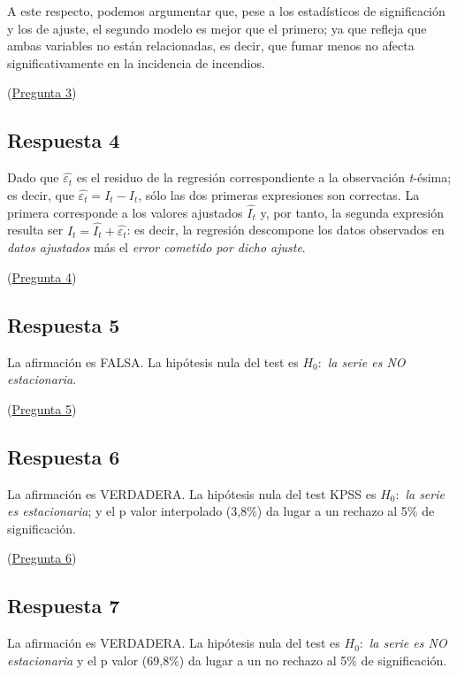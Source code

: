 \documentclass[10pt]{article}
\begin{document}
A este respecto, podemos argumentar que, pese a los estadísticos de significación y los de ajuste, el segundo modelo es mejor que el primero; ya que refleja que ambas variables no están relacionadas, es decir, que fumar menos no afecta significativamente en la incidencia de incendios.

(\hyperref[sec:org8d61215]{Pregunta 3})
\subsection*{Respuesta 4}
\label{sec:orgd2ab241}

Dado que  \(\widehat{\varepsilon_t}\) es el residuo de la regresión correspondiente a la observación \emph{t}-ésima; es decir, que \(\widehat{\varepsilon_t}={I_t}-\widehat{I_t}\), sólo las dos primeras expresiones son correctas. La primera corresponde a los valores ajustados \(\widehat{I_t}\) y, por tanto, la segunda expresión resulta ser \({I_t}=\widehat{I_t}+\widehat{\varepsilon_t}\): es decir, la regresión descompone los datos observados en \emph{datos ajustados} más el \emph{error cometido por dicho ajuste}.

(\hyperref[sec:orgb8b2484]{Pregunta 4})
\subsection*{Respuesta 5}
\label{sec:orgfdf3e39}

La afirmación es FALSA. La hipótesis nula del test es \(H_0:\) \emph{la serie es NO estacionaria}.

(\hyperref[sec:org86b0685]{Pregunta 5})
\subsection*{Respuesta 6}
\label{sec:orgf994f55}

La afirmación es VERDADERA. La hipótesis nula del test KPSS es \(H_0:\) \emph{la serie es estacionaria}; y el p valor interpolado (3,8\%) da lugar a un rechazo al 5\% de significación.

(\hyperref[sec:orge014ae7]{Pregunta 6})
\subsection*{Respuesta 7}
\label{sec:org1d2b1eb}

La afirmación es VERDADERA. La hipótesis nula del test es \(H_0:\) \emph{la serie es NO estacionaria} y el p valor (69,8\%) da lugar a un no rechazo al 5\% de significación.
\end{document}
